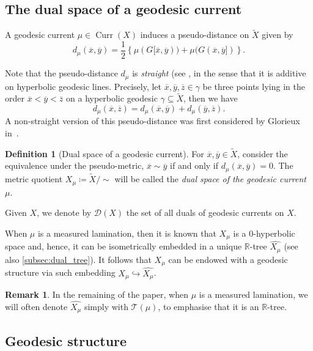\documentclass[12pt,article]{amsart}
\numberwithin{equation}{section}
\numberwithin{figure}{section}
\theoremstyle{definition}
\newtheorem{remark}[equation]{Remark}
\newtheorem{definition}[equation]{Definition}
\theoremstyle{plain}
\newcommand\R{\ensuremath{\mathbb{R}}}
\DeclareMathOperator{\Curr}{Curr}
\newcommand*{\wt}[1]{\widetilde{#1}}
\begin{document}
\subsection{The dual space of a geodesic current}
A geodesic current $\mu \in \Curr(X)$ induces a pseudo-distance on $\wt{X}$ given by
 \[
 d_\mu (\overline{x},\overline{y}) = \frac{1}{2} \left\{ \mu ( G[\overline{x},\overline{y})) + \mu ( G(\overline{x},\overline{y}] )\right\}.
 \]
 
 Note that the pseudo-distance $d_\mu$ is \emph{straight} (see \cite[Proposition 4.1]{BIPP21:Currents}, in the sense that it is additive on hyperbolic geodesic lines.
 Precisely, let $\overline{x}, \overline{y}, \overline{z} \in \gamma$ be three points lying in the order $\overline{x} < \overline{y} < \overline{z}$ on a hyperbolic geodesic $\gamma \subseteq \wt{X}$, then we have
 \[
 d_\mu (\overline{x}, \overline{z}) = d_\mu (\overline{x}, \overline{y}) + d_\mu (\overline{y},\overline{z}).
 \]
  A non-straight version of this pseudo-distance was first considered by Glorieux in~\cite{Glo17:CriticalExponents}.
 \begin{definition}[Dual space of a geodesic current]
 \label{def:currentdual}
 For $\overline{x}, \overline{y} \in \wt{X}$,  consider the equivalence under the pseudo-metric, $\overline{x} \sim \overline{y}$ if and only if $d_\mu (\overline{x},\overline{y}) =0$. The metric quotient $X_\mu \coloneqq \wt{X} / \sim$ will be called the \emph{dual space of the geodesic current} $\mu$.
 \end{definition}

  Given $X$, we denote by $\mathcal{D}(X)$ the set of all duals of geodesic currents on $X$.
 
  When $\mu$ is a measured lamination, then it is known that $X_\mu$ is a $0$-hyperbolic space and, hence, it can be isometrically embedded in a unique $\R$-tree $\widehat{X_\mu}$ (see also \ref{subsec:dual_tree}). It follows that $X_\mu$ can be endowed with a geodesic structure via such embedding $X_\mu \hookrightarrow \widehat{X_\mu}$.
  

  
  \begin{remark}
  In the remaining of the paper, when $\mu$ is a measured lamination, we will often denote $\widehat{X_\mu}$ simply with $\mathcal{T}(\mu)$, to emphasise that it is an $\R$-tree.
  \end{remark}

 \subsection{Geodesic structure}
\label{subsec:geodesics}
\end{document}
